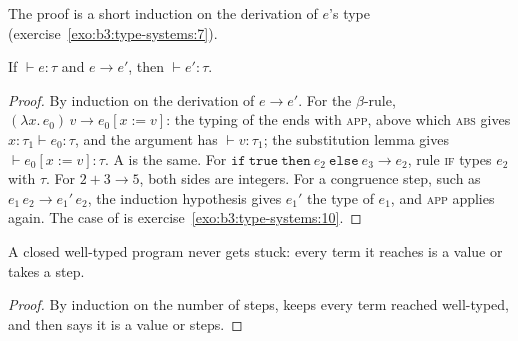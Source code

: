 The proof is a short induction on the derivation of $e$'s type (exercise~\ref{exo:b3:type-systems:7}).

\begin{theorem}[Preservation]\label{thm:b3:type-systems:preservation}
If $\vdash e : \tau$ and $e \to e'$, then $\vdash e' : \tau$.
\end{theorem}

\begin{proof}
By induction on the derivation of $e \to e'$. For the $\beta$-rule, $(\lambda x.\,e_0)\,v \to e_0[x := v]$: the typing of the  ends with \textsc{app}, above which \textsc{abs} gives $x : \tau_1 \vdash e_0 : \tau$, and the argument has $\vdash v : \tau_1$; the substitution lemma gives $\vdash e_0[x := v] : \tau$. A  is the same. For $\mathtt{if}\ \mathtt{true}\ \mathtt{then}\ e_2\ \mathtt{else}\ e_3 \to e_2$, rule \textsc{if} types $e_2$ with $\tau$. For $2 + 3 \to 5$, both sides are integers. For a congruence step, such as $e_1\,e_2 \to e_1'\,e_2$, the induction hypothesis gives $e_1'$ the type of $e_1$, and \textsc{app} applies again. The case of  is exercise~\ref{exo:b3:type-systems:10}.
\end{proof}

\begin{corollary}\label{cor:b3:type-systems:safety}
A closed well-typed program never gets stuck: every term it reaches is a value or takes a step.
\end{corollary}

\begin{proof}
By induction on the number of steps,  keeps every term reached well-typed, and  then says it is a value or steps.
\end{proof}

\begin{omfigure}
\par{}
\end{omfigure}

